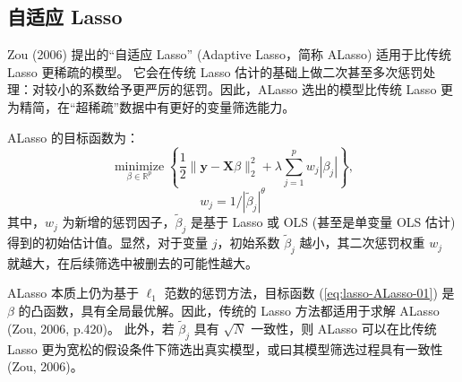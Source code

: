 %




\subsection{自适应 Lasso}\label{sec:adaptive-lasso}

Zou (2006) 提出的“自适应 Lasso” (Adaptive Lasso，简称 ALasso) 适用于比传统 Lasso 更稀疏的模型。%
它会在传统 Lasso 估计的基础上做二次甚至多次惩罚处理：对较小的系数给予更严厉的惩罚。因此，ALasso 选出的模型比传统 Lasso 更为精简，在“超稀疏”数据中有更好的变量筛选能力。

ALasso 的目标函数为：%
\begin{equation}\label{eq:lasso-ALasso-01}
	\underset{\beta \in \mathbb{R}^{p}}{\operatorname{minimize}}\left\{\frac{1}{2}\|\mathbf{y}-\mathbf{X} \beta\|_{2}^{2}+\lambda \sum_{j=1}^{p} w_{j}\left|\beta_{j}\right|\right\},
\end{equation}
$$w_{j}=1 / |\widetilde{\beta}_{j}|^{\theta}$$  
其中，$w_{j}$ 为新增的惩罚因子，$\widetilde{\beta}_{j}$ 是基于 Lasso 或 OLS (甚至是单变量 OLS 估计) 得到的初始估计值。显然，对于变量 $j$，初始系数 $\widetilde{\beta}_{j}$ 越小，其二次惩罚权重 $w_{j}$ 就越大，在后续筛选中被删去的可能性越大。

ALasso 本质上仍为基于 $\ell_{1}$ 范数的惩罚方法，目标函数 (\ref{eq:lasso-ALasso-01}) 是 $\beta$ 的凸函数，具有全局最优解。因此，传统的 Lasso 方法都适用于求解 ALasso (Zou, 2006, p.420)。
此外，若 $\widetilde{\beta}_{j}$ 具有 $\sqrt{N}$ 一致性，则 ALasso 可以在比传统 Lasso 更为宽松的假设条件下筛选出真实模型，或曰其模型筛选过程具有一致性 (Zou, 2006)。

